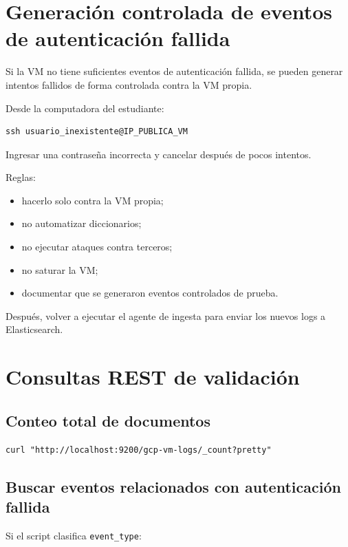 \documentclass[
  coursetitle={Cómputo Nube y Tecnologías Emergentes},
  coursehours={96},
  coursedate={Verano 2026},
  doctype={Práctica},
  otherlangs={english,french},
  authorname={Lázaro},
  authorsurname={Bustio-Martínez},
  authortitle={PhD},
  role={Profesor Investigador},
  email={lbustio@inaoe.mx},
  phone={5559504000},
  ext={7459},
  institution={Instituto Nacional de Astrofísica, Óptica y Electrónica (INAOE)},
  department={Maestría en Ciencias en Tecnologías de Seguridad},
  address={Luis Enrique Erro 1, Sta. Ma. Tonantzintla, San Andrés Cholula, CP 72840, Puebla, México},
  margin={0.5in}
]{../../lbustio_lecture_notes}
\begin{document}
\section{Generación controlada de eventos de autenticación fallida}

Si la VM no tiene suficientes eventos de autenticación fallida, se pueden generar intentos fallidos de forma controlada contra la VM propia.

Desde la computadora del estudiante:

\begin{lstlisting}
ssh usuario_inexistente@IP_PUBLICA_VM
\end{lstlisting}

Ingresar una contraseña incorrecta y cancelar después de pocos intentos.

Reglas:

\begin{itemize}
    \item hacerlo solo contra la VM propia;
    \item no automatizar diccionarios;
    \item no ejecutar ataques contra terceros;
    \item no saturar la VM;
    \item documentar que se generaron eventos controlados de prueba.
\end{itemize}

Después, volver a ejecutar el agente de ingesta para enviar los nuevos logs a Elasticsearch.

\section{Consultas REST de validación}

\subsection{Conteo total de documentos}

\begin{lstlisting}
curl "http://localhost:9200/gcp-vm-logs/_count?pretty"
\end{lstlisting}

\subsection{Buscar eventos relacionados con autenticación fallida}

Si el script clasifica \texttt{event\_type}:
\end{document}
